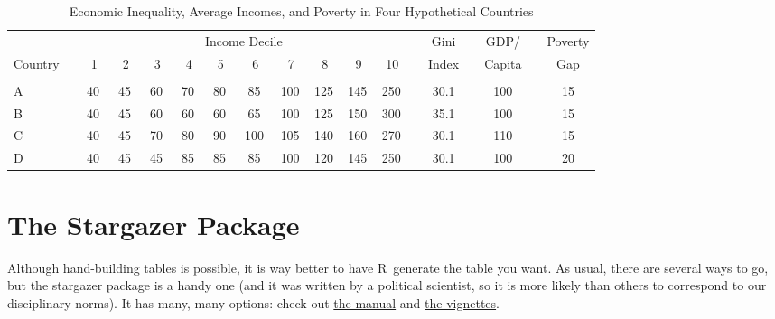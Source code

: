 \documentclass[12pt]{article}
\newcommand{\R}{\textsf{R}~}        %
\begin{document}
\begin{table}[hbtp] 
\caption{Economic Inequality, Average Incomes, and Poverty in Four Hypothetical Countries}
\label{T:sim}
\begin{small}
\begin{tabular}{l p{.5cm} c c c c c c c c c c p{.5cm} c p{.5cm} c p{.5cm} c}
\\
\hline
&& \multicolumn{10}{c}{Income Decile} & & Gini & & GDP/ & & Poverty\\
\cline{3-12} Country && 1 & 2 & 3 & 4 & 5 & 6 & 7 & 8 & 9 & 10 & & Index & & Capita & & Gap\\
\hline
\\
 A && \,40\,\, & \,45\,\, & \,60\,\, & \,70\,\, & \,80\,\, & \,85\,\, & 100\, & 125\, & 145\, & 250\, && 30.1 && 100 & & 15\\
 B && \,40\,\, & \,45\,\, & \,60\,\, & \,60\,\, & \,60\,\, & \,65\,\, & 100\, & 125\, & 150\, & 300\, && 35.1 && 100 & & 15\\
 C && \,40\,\, & \,45\,\, & \,70\,\, & \,80\,\, & \,90\,\, & \,100\,\, & 105\, & 140\, & 160\, & 270\, && 30.1 && 110 & & 15\\
 D && \,40\,\, & \,45\,\, & \,45\,\, & \,85\,\, & \,85\,\, & \,85\,\, & 100\, & 120\, & 145\, & 250\, && 30.1 && 100 & & 20\\
\hline
\end{tabular}
\end{small}
\end{table}

\newpage
\section{The Stargazer Package}
Although hand-building tables is possible, it is way better to have \R generate the table you want.  As usual, there are several ways to go, but the stargazer package is a handy one (and it was written by a political scientist, so it is more likely than others to correspond to our disciplinary norms).  It has many, many options: check out \href{http://cran.r-project.org/web/packages/stargazer/stargazer.pdf}{the manual} and \href{http://cran.r-project.org/web/packages/stargazer/vignettes/stargazer.pdf}{the vignettes}.
\end{document}
